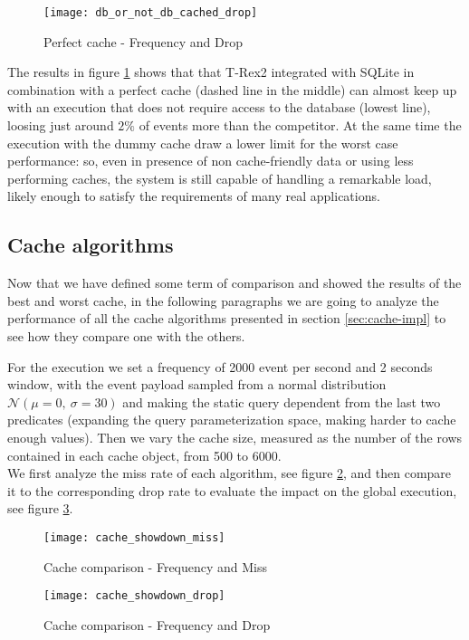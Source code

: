 \begin{figure}[h]
  \centering
  \texttt{[image: db\_or\_not\_db\_cached\_drop]}
  \caption{Perfect cache - Frequency and Drop}
  \label{fig:db_or_not_db_cached_drop}
\end{figure}

The results in figure \ref{fig:db_or_not_db_cached_drop} shows that that T-Rex2 integrated with SQLite in combination with a perfect cache (dashed line in the middle) can almost keep up with an execution that does not require access to the database (lowest line), loosing just around $2\%$ of events more than the competitor. At the same time the execution with the dummy cache draw a lower limit for the worst case performance: so, even in presence of non cache-friendly data or using less performing caches, the system is still capable of handling a remarkable load, likely enough to satisfy the requirements of many real applications.

\subsection{Cache algorithms}
Now that we have defined some term of comparison and showed the results of the best and worst cache, in the following paragraphs we are going to analyze the performance of all the cache algorithms presented in section \ref{sec:cache-impl} to see how they compare one with the others.

For the execution we set a frequency of 2000 event per second and 2 seconds window, with the event payload sampled from a normal distribution $\mathcal{N}(\mu = 0,\ \sigma = 30)$ and making the static query dependent from the last two predicates (expanding the query parameterization space, making harder to cache enough values). Then we vary the cache size, measured as the number of the rows contained in each cache object, from 500 to 6000.\\
We first analyze the miss rate of each algorithm, see figure \ref{fig:cache_showdown_miss}, and then compare it to the corresponding drop rate to evaluate the impact on the global execution, see figure \ref{fig:cache_showdown_drop}.

\begin{figure}[h]
  \centering
  \texttt{[image: cache\_showdown\_miss]}
  \caption{Cache comparison - Frequency and Miss}
  \label{fig:cache_showdown_miss}
\end{figure}
\begin{figure}[h]
  \centering
  \texttt{[image: cache\_showdown\_drop]}
  \caption{Cache comparison - Frequency and Drop}
  \label{fig:cache_showdown_drop}
\end{figure}

